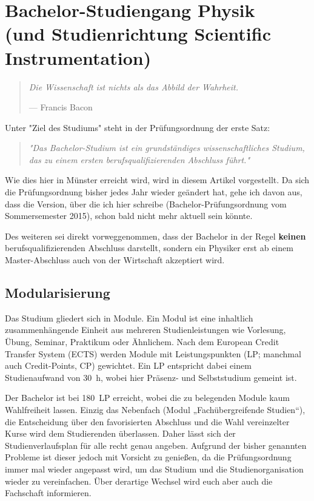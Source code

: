 
\section[Bachelor-Studiengang Physik]{Bachelor-Studiengang Physik\\(und Studienrichtung Scientific Instrumentation)}
\begin{multicols}{2}
\begin{quote}
\textit{Die Wissenschaft ist nichts als das Abbild der Wahrheit.}

\hfill--- Francis Bacon
\end{quote}
Unter "Ziel des Studiums" steht in der Prüfungsordnung der erste Satz:
\begin{quote}
\textit{"Das Bachelor-Studium ist ein grundständiges wissenschaftliches Studium, das zu einem ersten berufsqualifizierenden Abschluss führt."}
\end{quote}
Wie dies hier in Münster erreicht wird, wird in diesem Artikel vorgestellt. Da sich die Prüfungsordnung bisher jedes Jahr wieder geändert hat, gehe ich davon aus, dass die Version, über die ich hier schreibe (Bachelor-Prüfungsordnung vom Sommersemester 2015), schon bald nicht mehr aktuell sein könnte.

Des weiteren sei direkt vorweggenommen, dass der Bachelor in der Regel \textbf{keinen} berufsqualifizierenden Abschluss darstellt, sondern ein Physiker erst ab einem Master-Abschluss auch von der Wirtschaft akzeptiert wird.

\subsection*{Modularisierung}
Das Studium gliedert sich in Module. Ein Modul ist eine inhaltlich zusammenhängende Einheit aus mehreren Studienleistungen wie Vorlesung, Übung, Seminar, Praktikum oder Ähnlichem. Nach dem European Credit Transfer System (ECTS) werden Module mit Leistungspunkten (LP; manchmal auch Credit-Points, CP) gewichtet. Ein LP entspricht dabei einem Studienaufwand von \SI{30}{\hour}, wobei hier Präsenz- und Selbststudium gemeint ist.

Der Bachelor ist bei \SI{180}{LP} erreicht, wobei die zu belegenden Module kaum Wahlfreiheit lassen. Einzig das Nebenfach (Modul „Fachübergreifende Studien“), die Entscheidung über den favorisierten Abschluss und die Wahl vereinzelter Kurse wird dem Studierenden überlassen. Daher lässt sich der Studienverlaufsplan für alle recht genau angeben. Aufgrund der bisher genannten Probleme ist dieser jedoch mit Vorsicht zu genießen, da die Prüfungsordnung immer mal wieder angepasst wird, um das Studium und die Studienorganisation wieder zu vereinfachen. Über derartige Wechsel wird euch aber auch die Fachschaft informieren.


\end{multicols}
